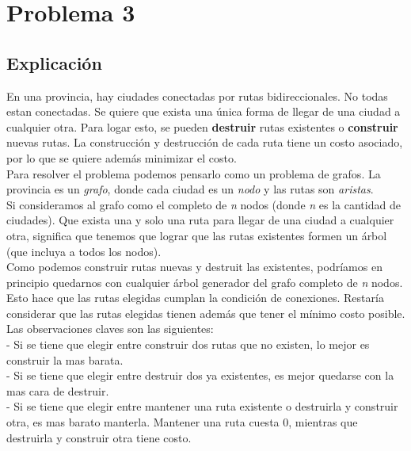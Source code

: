 
\section{Problema 3}
\subsection{Explicación}

En una provincia, hay ciudades conectadas por rutas bidireccionales. No todas estan conectadas. Se quiere que exista una única forma de llegar de una ciudad a cualquier otra. Para logar esto, se pueden \textbf{destruir} rutas existentes o \textbf{construir} nuevas rutas. La construcción y destrucción de cada ruta tiene un costo asociado, por lo que se quiere además minimizar el costo. \\

Para resolver el problema podemos pensarlo como un problema de grafos. La provincia es un \textit{grafo}, donde cada ciudad es un \textit{nodo} y las rutas son \textit{aristas}.  \\

Si consideramos al grafo como el completo de \textit{n} nodos (donde \textit{n} es la cantidad de ciudades). Que exista una y solo una ruta para llegar de una ciudad a cualquier otra, significa que tenemos que lograr que las rutas existentes formen un árbol (que incluya a todos los nodos).  \\

Como podemos construir rutas nuevas y destruit las existentes, podríamos en principio quedarnos con cualquier árbol generador del grafo completo de \textit{n} nodos. Esto hace que las rutas elegidas cumplan la condición de conexiones. Restaría considerar que las rutas elegidas tienen además que tener el mínimo costo posible. \\

Las observaciones claves son las siguientes: \\
- Si se tiene que elegir entre construir dos rutas que no existen, lo mejor es construir la mas barata. \\
- Si se tiene que elegir entre destruir dos ya existentes, es mejor quedarse con la mas cara de destruir. \\
- Si se tiene que elegir entre mantener una ruta existente o destruirla y construir otra, es mas barato manterla. Mantener una ruta cuesta 0, mientras que destruirla y construir otra tiene costo. \\

